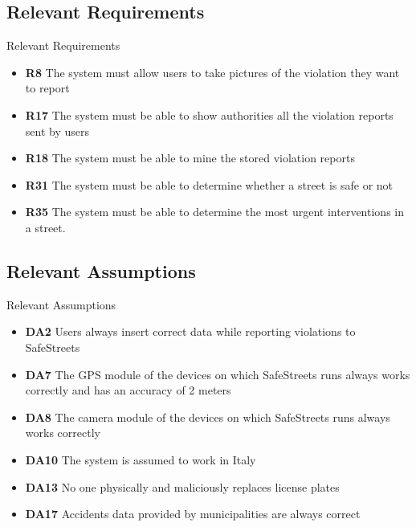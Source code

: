 	\subsection{Relevant Requirements}
		\begin{frame}{Relevant Requirements}
			\begin{itemize}
				\item \textbf{R8} The system must allow users to take pictures of the violation they want to report
				
				\item \textbf{R17} The system must be able to show authorities all the violation reports sent by users
				
				\item \textbf{R18} The system must be able to mine the stored violation reports
				
				\item \textbf{R31} The system must be able to determine whether a street is safe or not
				
				\item \textbf{R35} The system must be able to determine the most urgent interventions in a street.
			\end{itemize}
		\end{frame}
	
	\subsection{Relevant Assumptions}
		\begin{frame}{Relevant Assumptions}
			\begin{itemize}
				\item \textbf{DA2} Users always insert correct data while reporting violations to SafeStreets
				
				\item \textbf{DA7} The GPS module of the devices on which SafeStreets runs always works correctly and has an accuracy of 2 meters
				
				\item \textbf{DA8} The camera module of the devices on which SafeStreets runs always works correctly
				
				\item \textbf{DA10} The system is assumed to work in Italy
				
				\item \textbf{DA13} No one physically and maliciously replaces license plates
				
				\item \textbf{DA17} Accidents data provided by municipalities are always correct
			\end{itemize}
		\end{frame}

